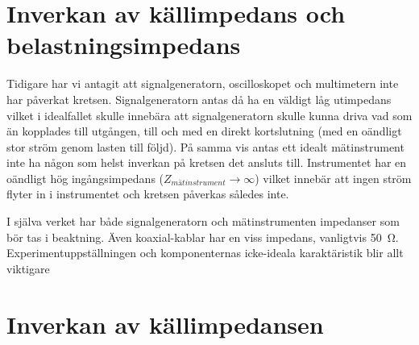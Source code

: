 %
%

\section{Inverkan av källimpedans och belastningsimpedans}\label{impedans}
Tidigare har vi antagit att signalgeneratorn, oscilloskopet och multimetern
inte har påverkat kretsen. Signalgeneratorn antas då ha en väldigt låg utimpedans
vilket i idealfallet skulle innebära att signalgeneratorn skulle kunna driva
vad som än kopplades till utgången, till och med en direkt kortslutning (med
en oändligt stor ström genom lasten till följd). På samma vis antas ett idealt
mätinstrument inte ha någon som helst inverkan på kretsen det ansluts till.
Instrumentet har en oändligt hög ingångsimpedans ($Z_{mätinstrument} \to
\infty$) vilket innebär att ingen ström flyter in i instrumentet och kretsen
påverkas således inte.

\par I själva verket har både signalgeneratorn och mätinstrumenten impedanser
som bör tas i beaktning. Även koaxial-kablar har en viss impedans, vanligtvis
\SI{50}{\ohm}. Experimentuppställningen och komponenternas icke-ideala
karaktäristik blir allt viktigare



\section{Inverkan av källimpedansen}\label{Zin}

